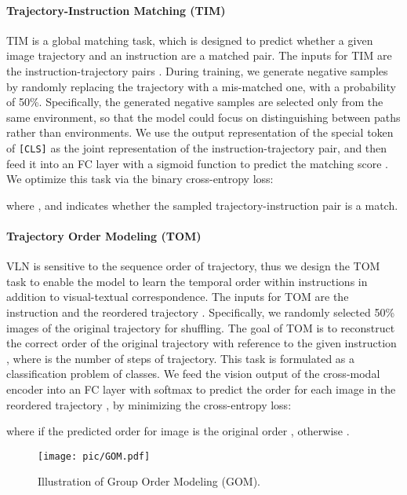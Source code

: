 \documentclass[10pt,twocolumn,letterpaper]{article}
\begin{document}
\vspace{-8pt}
\paragraph{Trajectory-Instruction Matching (TIM)} TIM is a global matching task, which is designed to predict whether a given image trajectory and an instruction are a matched pair.
The inputs for TIM are the instruction-trajectory pairs .
During training, we generate negative samples by randomly replacing the trajectory with a mis-matched one, with a probability of 50\%. 
Specifically, the generated negative samples are selected only from the same environment, so that the model could focus on distinguishing between paths rather than environments. We use the output representation of the special token of \texttt{[CLS]} as the joint representation of the instruction-trajectory pair, and then feed it into an FC layer with a sigmoid function to predict the matching score .
We optimize this task via the binary cross-entropy loss:

where , and  indicates whether the sampled trajectory-instruction pair is a match. 

\vspace{-8pt}
\paragraph{Trajectory Order Modeling (TOM)}
VLN is sensitive to the sequence order of trajectory,
thus we design the TOM task to enable the model to learn the temporal order within instructions in addition to visual-textual correspondence.
The inputs for TOM are the instruction  and the reordered trajectory . 
Specifically, we randomly selected 50\% images of the original trajectory  for shuffling. 
The goal of TOM is to reconstruct the correct order  of the original trajectory  
with reference to the given instruction , where  is the number of steps of trajectory.
This task is formulated as a classification problem of  classes. We feed the vision output of the cross-modal encoder into an FC layer with softmax to predict the order  for each image  in the reordered trajectory , by minimizing the cross-entropy loss:

\vspace{-5pt}

where  if the predicted order  for image  is the original order , otherwise .

\begin{figure}[!t]
	\begin{center}
		\texttt{[image: pic/GOM.pdf]}
	\end{center}
	\vspace{-13pt}
	\caption{Illustration of Group Order Modeling (GOM).
	}
	\label{fig:NVP}
	\vspace{-13pt}
\end{figure}
\end{document}
